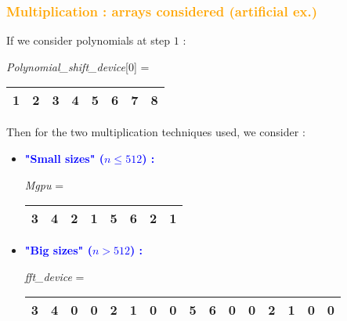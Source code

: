 \begin{frame}[fragile]
\frametitle{\textbf{\textcolor{orange}{Multiplication : arrays considered (artificial ex.)}}}

If we consider polynomials at step $1$ :

\tiny
\begin{center}
\textit{Polynomial\_shift\_device}[0] = \begin{tabular}{|c|c||c|c||c|c||c|c|}
\hline
1 & 2 & 3 & 4 & 5 & 6 & 7 & 8 \\
\hline
\end{tabular}
\end{center}

\normalsize
Then for the two multiplication techniques used, we consider :

\begin{block}{}
\begin{itemize}
\item \textcolor{blue}{\textbf{"Small sizes" ($n \leq 512$) :}}\\
\hspace{4mm}
\tiny
\begin{center}
\textit{Mgpu} = \begin{tabular}{|c|c||c|c||c|c||c|c|}
\hline
3 & 4 & 2 & 1 & 5 & 6 & 2 & 1 \\
\hline
\end{tabular}
\end{center}
\hspace{4mm}

\item \normalsize{\textcolor{blue}{\textbf{"Big sizes" ($n > 512$) :}}}\\
\hspace{4mm}
\tiny
\begin{center}
\textit{fft\_device} = \begin{tabular}{|c|c|c|c||c|c|c|c||c|c|c|c||c|c|c|c|}
\hline
3 & 4 & 0 & 0 & 2 & 1 & 0 & 0 & 5 & 6 & 0 & 0 & 2 & 1 & 0 & 0 \\
\hline
\end{tabular}
\end{center}
\end{itemize}
\end{block}

\end{frame}

